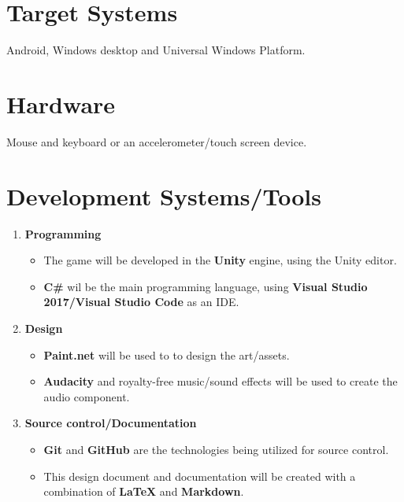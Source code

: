 \documentclass[a4paper]{scrreprt}
\begin{document}
\section{Target Systems}
Android, Windows desktop and Universal Windows Platform.

\section{Hardware}
Mouse and keyboard or an accelerometer/touch screen device.

\section{Development Systems/Tools}
\begin{enumerate}
  \item \textbf{Programming}
  \begin{itemize}
    \item The game will be developed in the \textbf{Unity} engine, using the Unity editor. 
    \item \textbf{C\#} wil be the main programming language, using \textbf{Visual Studio 2017/Visual Studio Code} as an IDE.
  \end{itemize}
  \item \textbf{Design}
  \begin{itemize}
    \item \textbf{Paint.net} will be used to to design the art/assets.
    \item \textbf{Audacity} and royalty-free music/sound effects will be used to create the audio component.
  \end{itemize}
  \item \textbf{Source control/Documentation}
  \begin{itemize}
    \item \textbf{Git} and \textbf{GitHub} are the technologies being utilized for source control. 
    \item This design document and documentation will be created with a combination of \textbf{LaTeX} and \textbf{Markdown}.
  \end{itemize}

\end{enumerate}


  
\end{document}
